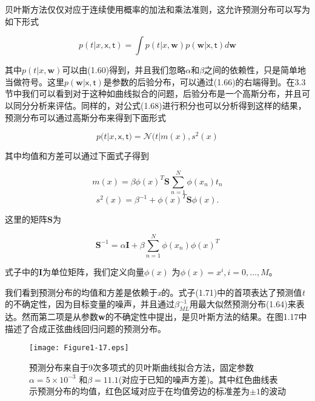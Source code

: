 	贝叶斯方法仅仅对应于连续使用概率的加法和乘法准则，这允许预测分布可以写为如下形式
	
	\begin{equation}
	p(t|x, \mathsf{x}, \mathsf{t}) = \int p(t| x, \textbf{w}) p(\textbf{w}| \mathsf{x}, \mathsf{t})d\textbf{w}
	\end{equation}
	
	其中$p(t|x, \textbf{w})$可以由(1.60)得到，并且我们忽略$\alpha$和$\beta$之间的依赖性，只是简单地当做符号。这里$p(\textbf{w}|\mathsf{x}, \mathsf{t})$是参数的后验分布，可以通过(1.66)的右端得到。在3.3节中我们可以看到对于这种如曲线拟合的问题，后验分布是一个高斯分布，并且可以同分分析来评估。同样的，对公式(1.68)进行积分也可以分析得到这样的结果，预测分布可以通过高斯分布来得到下面形式
	
	\begin{equation}
	p(t|x, \mathsf{x}, \mathsf{t}) = \mathcal{N}(t|m(x),s^2(x)
	\end{equation}
	
	其中均值和方差可以通过下面式子得到
	
	\begin{equation}
	m(x) = \beta \phi (x)^T \textbf{S} \sum_{n = 1}^{N} \phi (x_n) t_n
	\end{equation}
	\begin{equation}
	s^2(x) = \beta^{-1} + \phi (x)^T \textbf{S} \phi (x).
	\end{equation}
	
	这里的矩阵\textbf{S}为
	
	\begin{equation}
	\textbf{S}^{-1} = \alpha \textbf{I} + \beta \sum_{n = 1}^{N} \phi (x_n) \phi (x)^T
	\end{equation}
	
	式子中的\textbf{I}为单位矩阵，我们定义向量$\phi(x)$ 为$\phi (x) = x^i, i = 0, \dots, M$。
	
	我们看到预测分布的均值和方差是依赖于\textit{x}的。式子(1.71)中的首项表达了预测值\textit{t}的不确定性，因为目标变量的噪声，并且通过$\beta_{ML}^{-1}$用最大似然预测分布(1.64)来表达。然而第二项是从参数\textbf{w}的不确定性中提出，是贝叶斯方法的结果。在图1.17中描述了合成正弦曲线回归问题的预测分布。
	
	\begin{figure}[t]
		\parbox{.4\textwidth}{\caption{ 预测分布来自于9次多项式的贝叶斯曲线拟合方法，固定参数$\alpha = 5 \times 10^{-3}$ 和$\beta = 11.1$(对应于已知的噪声方差)。其中红色曲线表示预测分布的均值，红色区域对应于在均值旁边的标准差为$\pm 1$的波动 }}
		\parbox{.5\textwidth}{\texttt{[image: Figure1-17.eps]}}
	\end{figure}
	

